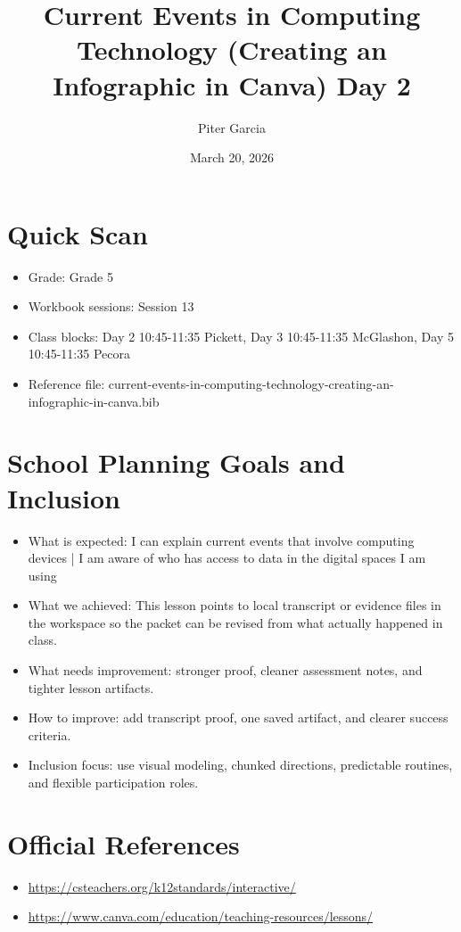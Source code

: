 \documentclass[11pt]{article}
\title{Current Events in Computing Technology (Creating an Infographic in Canva) Day 2}
\author{Piter Garcia}
\date{March 20, 2026}
\begin{document}
    \maketitle
    \section*{Quick Scan}
    \begin{itemize}[leftmargin=*]
    \item Grade: Grade 5
    \item Workbook sessions: Session 13
    \item Class blocks: Day 2 10:45-11:35 Pickett, Day 3 10:45-11:35 McGlashon, Day 5 10:45-11:35 Pecora
    \item Reference file: current-events-in-computing-technology-creating-an-infographic-in-canva.bib
    \end{itemize}
    \section*{School Planning Goals and Inclusion}
    \begin{itemize}[leftmargin=*]
    \item What is expected: I can explain current events that involve computing devices | I am aware of who has access to data in the digital spaces I am using
    \item What we achieved: This lesson points to local transcript or evidence files in the workspace so the packet can be revised from what actually happened in class.
    \item What needs improvement: stronger proof, cleaner assessment notes, and tighter lesson artifacts.
    \item How to improve: add transcript proof, one saved artifact, and clearer success criteria.
    \item Inclusion focus: use visual modeling, chunked directions, predictable routines, and flexible participation roles.
    \end{itemize}
    \section*{Official References}
    \begin{itemize}[leftmargin=*]
    \item \url{https://csteachers.org/k12standards/interactive/}
\item \url{https://www.canva.com/education/teaching-resources/lessons/}

    \end{itemize}
    
\end{document}
